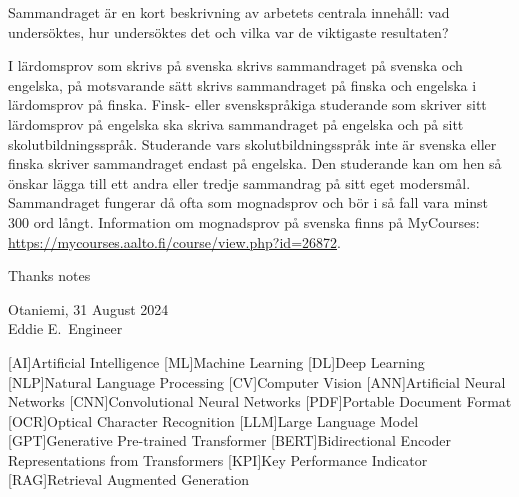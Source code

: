 \documentclass[english, 12pt, a4paper, elec, utf8, a-2b, online]{aaltothesis}
\begin{document}
\begin{abstractpage}[swedish]
Sammandraget är en kort beskrivning av arbetets centrala innehåll: vad
undersöktes, hur undersöktes det och vilka var de viktigaste resultaten?

I lärdomsprov som skrivs på svenska skrivs sammandraget på svenska och engelska,
på motsvarande sätt skrivs sammandraget på finska och engelska i lärdomsprov på
finska. Finsk- eller svenskspråkiga studerande som skriver sitt lärdomsprov på
engelska ska skriva sammandraget på engelska och på sitt skolutbildningsspråk.
Studerande vars skolutbildningsspråk inte är svenska eller finska skriver
sammandraget endast på engelska. Den studerande kan om hen så önskar lägga till
ett andra eller tredje sammandrag på sitt eget modersmål. Sammandraget fungerar
då ofta som mognadsprov och bör i så fall vara minst 300 ord långt. Information
om mognadsprov på svenska finns på MyCourses:\\
\url{https://mycourses.aalto.fi/course/view.php?id=26872}.
\end{abstractpage}


\dothesispagenumbering{}


Thanks notes

\vspace{5cm}
Otaniemi, 31 August 2024\\

\vspace{5mm}
{\hfill Eddie E.\ Engineer \hspace{1cm}}

\newpage


\thesistableofcontents

\cleardoublepage

\newpage

[AI]{Artificial Intelligence}
[ML]{Machine Learning}
[DL]{Deep Learning}
[NLP]{Natural Language Processing}
[CV]{Computer Vision}
[ANN]{Artificial Neural Networks}
[CNN]{Convolutional Neural Networks}
[PDF]{Portable Document Format}
[OCR]{Optical Character Recognition}
[LLM]{Large Language Model}
[GPT]{Generative Pre-trained Transformer}
[BERT]{Bidirectional Encoder Representations from Transformers}
[KPI]{Key Performance Indicator}
[RAG]{Retrieval Augmented Generation}
\end{document}
